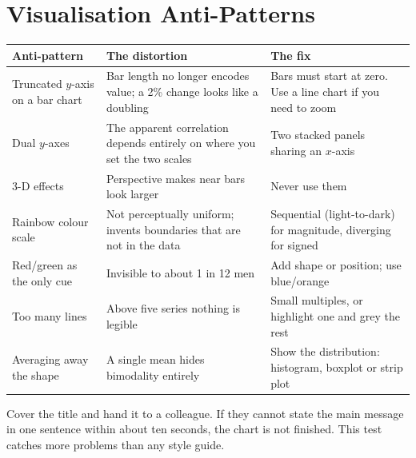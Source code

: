 \section{Visualisation Anti-Patterns}

\begin{longtable}{@{}L{4.2cm}L{5.2cm}L{5.1cm}@{}}
\toprule
{}
\textbf{Anti-pattern} & \textbf{The distortion} & \textbf{The fix} \\
\midrule
\endhead
Truncated $y$-axis on a bar chart & Bar length no longer encodes value; a 2\% change looks like a doubling & Bars must start at zero. Use a line chart if you need to zoom \\
Dual $y$-axes & The apparent correlation depends entirely on where you set the two scales & Two stacked panels sharing an $x$-axis \\
3-D effects & Perspective makes near bars look larger & Never use them \\
Rainbow colour scale & Not perceptually uniform; invents boundaries that are not in the data & Sequential (light-to-dark) for magnitude, diverging for signed \\
Red/green as the only cue & Invisible to about 1 in 12 men & Add shape or position; use blue/orange \\
Too many lines & Above five series nothing is legible & Small multiples, or highlight one and grey the rest \\
Averaging away the shape & A single mean hides bimodality entirely & Show the distribution: histogram, boxplot or strip plot \\
\bottomrule
\end{longtable}

\begin{conceptbox}
Cover the title and hand it to a colleague. If they cannot state the main message
in one sentence within about ten seconds, the chart is not finished. This test
catches more problems than any style guide.
\end{conceptbox}

